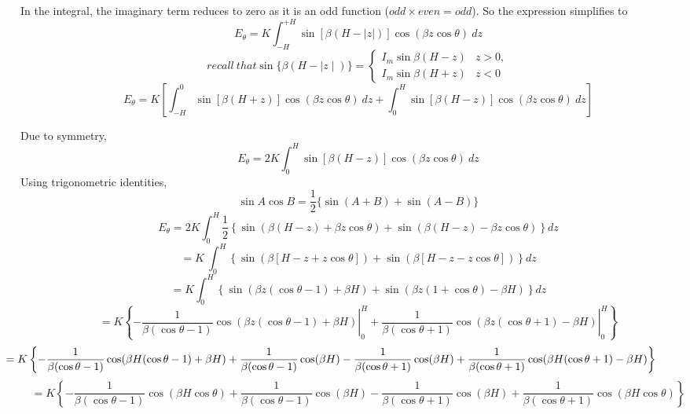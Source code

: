 In the integral, the imaginary term reduces to zero as it is an odd function ($odd \times even = odd$). So the expression simplifies to 
$$
E_\theta = K\int^{+H}_{-H}\sin[\beta(H - |z|)]\cos(\beta z\cos\theta)\ dz
$$
$$
recall \ that \sin \{\beta(H - \mid z\mid)\} = \begin{cases} I_m\sin{\beta(H - z)}& \text{$z > 0,$}\\
I_m\sin{\beta(H + z)}&\text{$z < 0$}	\end{cases}
$$
\begin{dmath*}
E_\theta = K\left[ \int^0_{-H}\sin[\beta(H + z)]\cos(\beta z\cos\theta)\ dz + 
\int^H_0\sin[\beta(H - z)]\cos(\beta z\cos\theta)\ dz \right]
\end{dmath*}

Due to symmetry,$$ E_\theta = 2K\int^H_0\sin[\beta(H - z)]\cos(\beta z\cos\theta)\ dz $$
Using trigonometric identities,
$$
\sin A\cos B = \dfrac{1}{2}\{\sin(A + B) + \sin(A - B)\}
$$
\begin{dmath*}
E_{\theta} =2K\int_{0}^{H} \dfrac{1}{2}\left\lbrace\sin(\beta(H-z) +\beta z\cos \theta) + \sin(\beta(H-z) - \beta z\cos \theta) \right\rbrace dz
\end{dmath*}
\begin{dmath*}
=K\ \int_{0}^{H}\left\lbrace\sin(\beta[H-z+z\cos \theta]) + \sin(\beta[H-z-z\cos \theta])\right \rbrace dz
\end{dmath*}
\begin{dmath*}
=K\int_{0}^{H}\left\lbrace\sin(\beta z(\cos \theta -1) + \beta H)+ {\sin(\beta z(1 + \cos \theta) - \beta H)}\right\rbrace dz
\end{dmath*}
\begin{dmath*}
=K\left\lbrace \left.-\dfrac{1}{\beta(\cos\theta -1)} \cos(\beta z(\cos\theta -1) + \beta H) \right|_{0}^{H} +\left. \dfrac{1}{\beta(\cos \theta + 1)} \cos(\beta z(\cos\theta + 1) - \beta H)\right|_{0}^{H} \right\rbrace
\end{dmath*}
\begin{dmath*}
\hspace{-50pt}=K\left\lbrace-\dfrac{1}{\beta(\cos\theta -1)} \cos(\beta H(\cos\theta -1) + \beta H) + \dfrac{1}{\beta(\cos\theta -1)} \cos(\beta H) - \dfrac{1}{\beta(\cos\theta + 1)} \cos(\beta H) +\dfrac{1}{\beta(\cos\theta + 1)} \cos(\beta H(\cos\theta + 1) -\beta H)\right\rbrace
\end{dmath*}
\begin{dmath*}
=K\left\lbrace -\dfrac{1}{\beta(\cos \theta -1)} \cos(\beta H \cos\theta) + \dfrac{1}{\beta(\cos\theta - 1)} \cos(\beta H) - \dfrac{1}{\beta(\cos\theta + 1)} \cos(\beta H) + \dfrac{1}{\beta(\cos\theta + 1)} \cos(\beta H \cos\theta)\right\rbrace
\end{dmath*}
